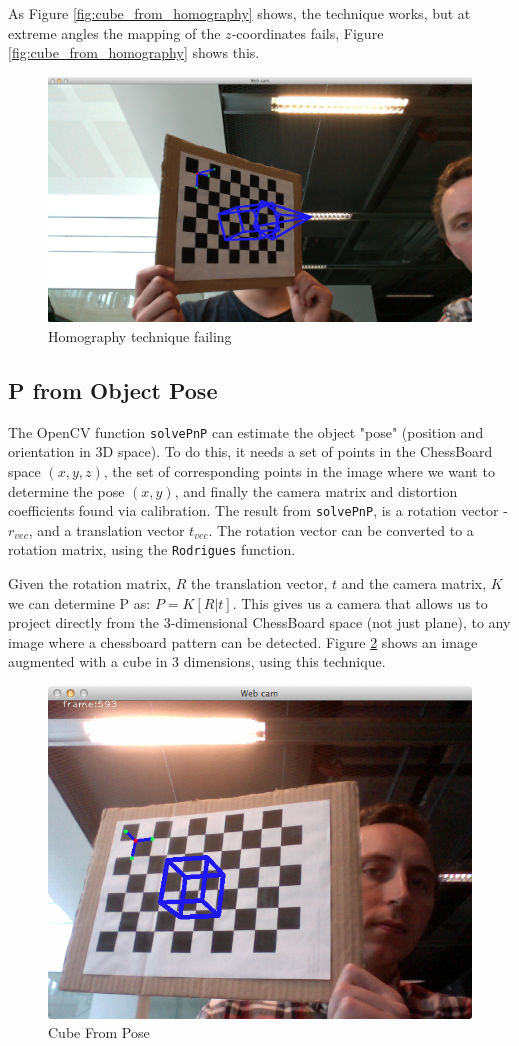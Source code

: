 \documentclass[a4paper,11pt]{article}
\begin{document}
As Figure \ref{fig:cube_from_homography} shows, the technique works, but at extreme angles the mapping of the $z$-coordinates fails, Figure \ref{fig:cube_from_homography} shows this.\\


\begin{figure}[H]
\centering
\includegraphics[width=0.8\linewidth]{cube_from_homography_fail}
\caption{Homography technique failing}
\label{fig:cube_from_homography_fail}
\end{figure}
\subsection{P from Object Pose}
The OpenCV function \texttt{solvePnP} can estimate the object "pose" (position and orientation in 3D space). To do this, it needs a set of points in the ChessBoard space $(x, y, z)$, the set of corresponding points in the image where we want to determine the pose $(x, y)$, and finally the camera matrix and distortion coefficients found via calibration. The result from \texttt{solvePnP}, is a rotation vector - $r_{vec}$, and a translation vector $t_{vec}$. The rotation vector can be converted to a rotation matrix, using the \texttt{Rodrigues} function.

Given the rotation matrix, $R$ the translation vector, $t$ and the camera matrix, $K$ we can determine P as: $P=K[R|t]$. This gives us a camera that allows us to project directly from the 3-dimensional ChessBoard space (not just plane), to any image where a chessboard pattern can be detected. Figure \ref{fig:cube_from_pose} shows an image augmented with a cube in 3 dimensions, using this technique.
\begin{figure}[H]
\centering
\includegraphics[width=0.8\linewidth]{pose_cube}
\caption{Cube From Pose}
\label{fig:cube_from_pose}
\end{figure}
\end{document}
